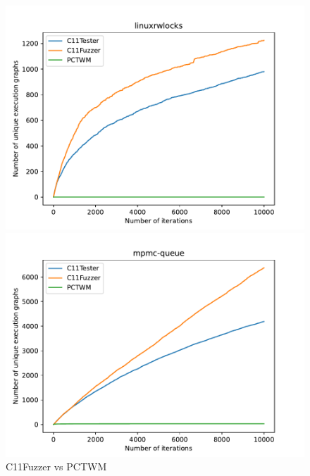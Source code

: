 \begin{figure}[H]
    \begin{minipage}{0.45\textwidth}
        \centering
        \includegraphics[width=\textwidth]{figure/pctwm/linuxrwlocks.pdf}
    \end{minipage}
    \hfill
    \begin{minipage}{0.45\textwidth}
        \centering
        \includegraphics[width=\textwidth]{figure/pctwm/mpmc-queue.pdf}
    \end{minipage}
    \vspace{0.5cm}

    \caption{C11Fuzzer vs PCTWM}
    \label{fig:fuzz-vs-pctwm}
\end{figure}



